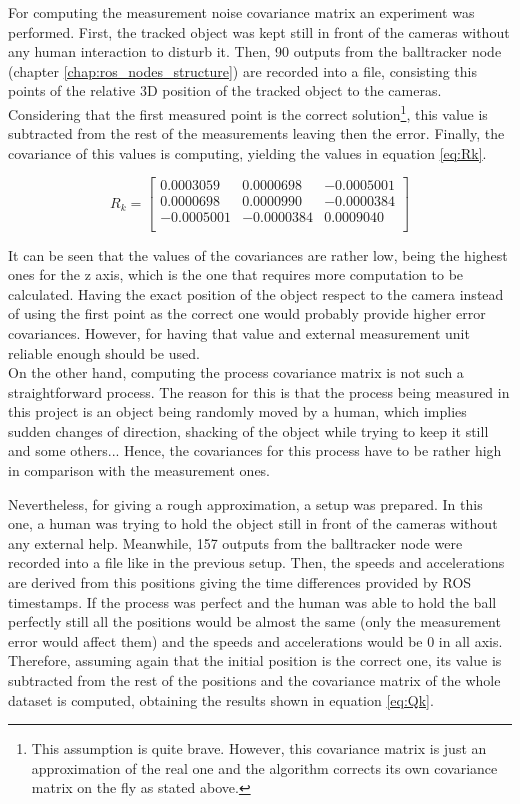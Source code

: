 For computing the measurement noise covariance matrix an experiment was performed. First, the tracked object was kept still in front of the cameras without any human interaction to disturb it. Then, 90 outputs from the balltracker node (chapter \ref{chap:ros_nodes_structure}) are recorded into a file, consisting this points of the relative 3D position of the tracked object to the cameras. Considering that the first measured point is the correct solution\footnote{This assumption is quite brave. However, this covariance matrix is just an approximation of the real one and the algorithm corrects its own covariance matrix on the fly as stated above.}, this value is subtracted from the rest of the measurements leaving then the error. Finally, the covariance of this values is computing, yielding the values in equation \ref{eq:Rk}.

\begin{equation}
R_{k}=
\begin{bmatrix}
0.0003059 & 0.0000698 & -0.0005001 \\
0.0000698 & 0.0000990 & -0.0000384 \\
-0.0005001 & -0.0000384 & 0.0009040 \\
\end{bmatrix}
\label{eq:Rk}
\end{equation}

It can be seen that the values of the covariances are rather low, being the highest ones for the z axis, which is the one that requires more computation to be calculated. Having the exact position of the object respect to the camera instead of using the first point as the correct one would probably provide higher error covariances. However, for having that value and external measurement unit reliable enough should be used. \\

On the other hand, computing the process covariance matrix is not such a straightforward process. The reason for this is that the process being measured in this project is an object being randomly moved by a human, which implies sudden changes of direction, shacking of the object while trying to keep it still and some others... Hence, the covariances for this process have to be rather high in comparison with the measurement ones.

Nevertheless, for giving a rough approximation, a setup was prepared. In this one, a human was trying to hold the object still in front of the cameras without any external help. Meanwhile, 157 outputs from the balltracker node were recorded into a file like in the previous setup. Then, the speeds and accelerations are derived from this positions giving the time differences provided by ROS timestamps. If the process was perfect and the human was able to hold the ball perfectly still all the positions would be almost the same (only the measurement error would affect them) and the speeds and accelerations would be 0 in all axis. Therefore, assuming again that the initial position is the correct one, its value is subtracted from the rest of the positions and the covariance matrix of the whole dataset is computed, obtaining the results shown in equation \ref{eq:Qk}.


